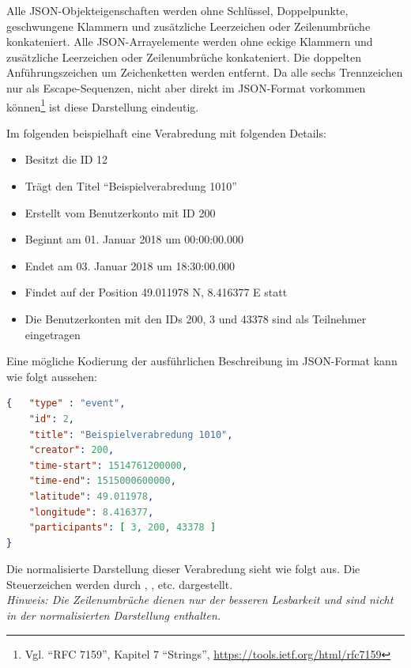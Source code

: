 \documentclass[parskip=full,11pt]{scrartcl}
\begin{document}
Alle JSON-Objekteigenschaften werden ohne Schlüssel, Doppelpunkte, geschwungene
Klammern und zusätzliche Leerzeichen oder Zeilenumbrüche konkateniert.
Alle JSON-Arrayelemente werden ohne eckige Klammern und zusätzliche
Leerzeichen oder Zeilenumbrüche konkateniert.
Die doppelten Anführungszeichen um Zeichenketten werden entfernt.
Da alle sechs Trennzeichen nur als Escape-Sequenzen, nicht aber direkt im
JSON-Format vorkommen können\footnote{Vgl. \enquote{RFC 7159}, Kapitel 7
\enquote{Strings}, \url{https://tools.ietf.org/html/rfc7159}} ist diese
Darstellung eindeutig.

\par Im folgenden beispielhaft eine Verabredung mit folgenden Details:
\begin{itemize}
    \item Besitzt die ID 12
    \item Trägt den Titel \enquote{Beispielverabredung 1010}
    \item Erstellt vom Benutzerkonto mit ID 200
    \item Beginnt am 01. Januar 2018 um 00:00:00.000
    \item Endet am 03. Januar 2018 um 18:30:00.000
    \item Findet auf der Position 49.011978 N, 8.416377 E statt
    \item Die Benutzerkonten mit den IDs 200, 3 und 43378 sind als Teilnehmer
        eingetragen
\end{itemize}

Eine mögliche Kodierung der ausführlichen Beschreibung im JSON-Format kann wie
folgt aussehen:
\begin{lstlisting}[language=json,firstnumber=1]
{   "type" : "event",
    "id": 2,
    "title": "Beispielverabredung 1010",
    "creator": 200,
    "time-start": 1514761200000,
    "time-end": 1515000600000,
    "latitude": 49.011978,
    "longitude": 8.416377,
    "participants": [ 3, 200, 43378 ]
}
\end{lstlisting}

\newcommand*\circled[1]{\tikz[baseline=(char.base)]{
            \node[shape=circle,draw,inner sep=1pt] (char) {\scriptsize #1};}}

Die normalisierte Darstellung dieser Verabredung sieht wie folgt aus.
Die Steuerzeichen werden durch \circled{1}, \circled{2}, \circled{3} etc.
dargestellt.\\
\textit{Hinweis: Die Zeilenumbrüche dienen nur der besseren Lesbarkeit und sind
nicht in der normalisierten Darstellung enthalten.}
\end{document}

